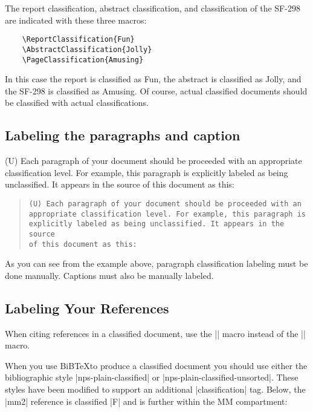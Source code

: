 The report classification, abstract classification, and classification
of the SF-298 are indicated with these three macros:

\begin{Verbatim}
    \ReportClassification{Fun}
    \AbstractClassification{Jolly}
    \PageClassification{Amusing}
\end{Verbatim}

In this case the report is classified as Fun, the abstract is classified
as Jolly, and the SF-298 is classified as Amusing. Of course, actual 
classified documents should be classified with actual classifications.

\subsection{Labeling the paragraphs and caption}

(U) Each paragraph of your document should be proceeded with an
appropriate classification level. For example, this paragraph is
explicitly labeled as being unclassified. It appears in the source of
this document as this:

\begin{quotation}
\begin{Verbatim}[fontsize=\small]
(U) Each paragraph of your document should be proceeded with an
appropriate classification level. For example, this paragraph is
explicitly labeled as being unclassified. It appears in the source 
of this document as this:
\end{Verbatim}
\end{quotation}

As you can see from the example above, paragraph classification
labeling must be done manually. Captions must also be manually labeled.

\subsection{Labeling Your References}

When citing references in a classified document, use the
|\citeafter{}| macro instead of the |\cite{}| macro.

When you use BiB\TeX to produce a classified document you should use
either the bibliographic style |nps-plain-classified| or
|nps-plain-classified-unsorted|. These styles have been modified to
support an additional |classification| tag. Below, the |mm2| reference
is classified |F| and is further within the MM compartment:

